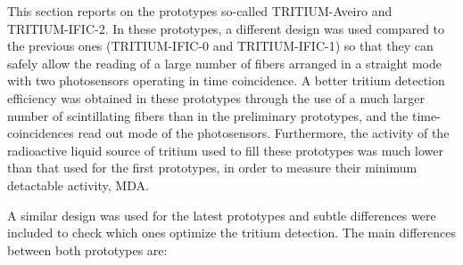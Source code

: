 This section reports on the prototypes so-called TRITIUM-Aveiro and TRITIUM-IFIC-2. In these prototypes, a different design was used compared to the previous ones (TRITIUM-IFIC-0 and TRITIUM-IFIC-1) so that they can safely allow the reading of a large number of fibers arranged in a straight mode with two photosensors operating in time coincidence. A better tritium detection efficiency was obtained in these prototypes through the use of a much larger number of scintillating fibers than in the preliminary prototypes, and the time-coincidences read out mode of the photosensors. Furthermore, the activity of the radioactive liquid source of tritium used to fill these prototypes was much lower than that used for the first prototypes, in order to measure their minimum detactable activity, MDA. 

A similar design was used for the latest prototypes and subtle differences were included to check which ones optimize the tritium detection. The main differences between both prototypes are:

